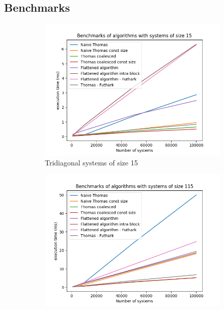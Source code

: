 \documentclass[a4paper,oneside]{memoir}
\begin{document}
\subsection{Benchmarks}

\vspace*{\fill}

\begin{figure}[H]
    \begin{subfigure}[b]{0.6\textwidth}
        \centering
        \includegraphics[width=\textwidth]{timings_15.png}
        \caption{Tridiagonal systems of size 15}
        \label{fig:bench15}
    \end{subfigure}
    \begin{subfigure}[b]{0.6\textwidth}
        \centering
    \includegraphics[width=\textwidth]{timings_115.png}

\end{subfigure}
\end{figure}
\end{document}
